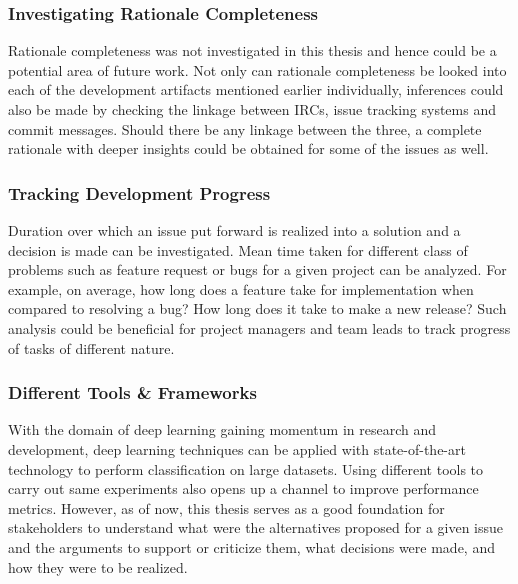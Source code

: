 \documentclass[a4paper,12pt,twoside]{report}
\begin{document}
\subsubsection{Investigating Rationale Completeness}
Rationale completeness was not investigated in this thesis and hence could be a potential area of future work. Not only can rationale completeness be looked into each of the development artifacts mentioned earlier individually, inferences could also be made by checking the linkage between \acs{IRC}s, issue tracking systems and commit messages. Should there be any linkage between the three, a complete rationale with deeper insights could be obtained for some of the issues as well. 

\subsubsection{Tracking Development Progress}
Duration over which an issue put forward is realized into a solution and a decision is made can be investigated. Mean time taken for different class of problems such as feature request or bugs for a given project can be analyzed. For example, on average, how long does a feature take for implementation when compared to resolving a bug? How long does it take to make a new release? Such analysis could be beneficial for project managers and team leads to track progress of tasks of different nature. 

\subsubsection{Different Tools \& Frameworks}
With the domain of deep learning gaining momentum in research and development, deep learning techniques can be applied with state-of-the-art technology to perform classification on large datasets. Using different tools to carry out same experiments also opens up a channel to improve performance metrics. However, as of now, this thesis serves as a good foundation for stakeholders to understand what were the alternatives proposed for a given issue and the arguments to support or criticize them, what decisions were made, and how they were to be realized. 
\end{document}
